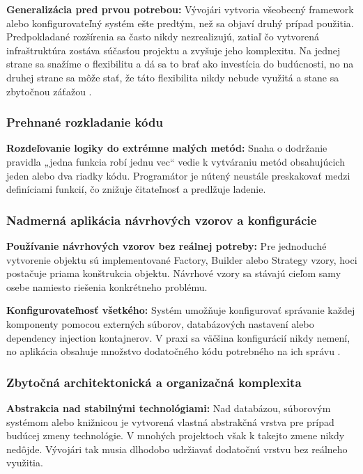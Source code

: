 \textbf{Generalizácia pred prvou potrebou:} Vývojári vytvoria všeobecný framework alebo konfigurovateľný systém ešte predtým, než sa objaví druhý prípad použitia. Predpokladané rozšírenia sa často nikdy nezrealizujú, zatiaľ čo vytvorená infraštruktúra zostáva súčasťou projektu a zvyšuje jeho komplexitu. Na jednej strane sa snažíme o flexibilitu a dá sa to brať ako investícia do budúcnosti, no na druhej strane sa môže stať, že táto flexibilita nikdy nebude využitá a stane sa zbytočnou záťažou \cite{HIDDENCOST_KESWANI2025,REDDIT_CLEANCODE2025}.

\subsubsection{Prehnané rozkladanie kódu}

\textbf{Rozdeľovanie logiky do extrémne malých metód:} Snaha o dodržanie pravidla „jedna funkcia robí jednu vec“ vedie k vytváraniu metód obsahujúcich jeden alebo dva riadky kódu. Programátor je nútený neustále preskakovať medzi definíciami funkcií, čo znižuje čitateľnosť a predlžuje ladenie.

\subsubsection{Nadmerná aplikácia návrhových vzorov a konfigurácie}

\textbf{Používanie návrhových vzorov bez reálnej potreby:} Pre jednoduché vytvorenie objektu sú implementované Factory, Builder alebo Strategy vzory, hoci postačuje priama konštrukcia objektu. Návrhové vzory sa stávajú cieľom samy osebe namiesto riešenia konkrétneho problému.

\textbf{Konfigurovateľnosť všetkého:} Systém umožňuje konfigurovať správanie každej komponenty pomocou externých súborov, databázových nastavení alebo dependency injection kontajnerov. V praxi sa väčšina konfigurácií nikdy nemení, no aplikácia obsahuje množstvo dodatočného kódu potrebného na ich správu \cite{HIDDENCOST_KESWANI2025, REDDIT_CLEANCODE2025}.

\subsubsection{Zbytočná architektonická a organizačná komplexita}

\textbf{Abstrakcia nad stabilnými technológiami:} Nad databázou, súborovým systémom alebo knižnicou je vytvorená vlastná abstrakčná vrstva pre prípad budúcej zmeny technológie. V mnohých projektoch však k takejto zmene nikdy nedôjde. Vývojári tak musia dlhodobo udržiavať dodatočnú vrstvu bez reálneho využitia.

